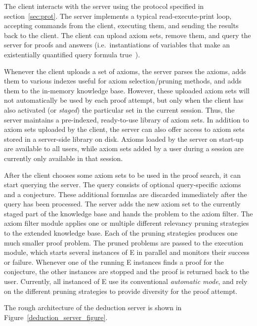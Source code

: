 \documentclass{article}
\begin{document}
The client interacts with the server using the protocol specified in
section~\ref{sec:prot}. The server implements a typical
read-execute-print loop, accepting commands from the client, executing
them, and sending the results back to the client. The client can
upload axiom sets, remove them, and query the server for proofs and
answers (i.e.\ instantiations of variables that make an existentially
quantified query formula true~\cite{SSSU:TPTP-ANS}).

Whenever the client uploads a set of axioms, the server parses the
axioms, adds them to various indexes useful for axiom
selection/pruning methods, and adds them to the in-memory knowledge
base. However, these uploaded axiom sets will not automatically be
used by each proof attempt, but only when the client has also
activated (or \emph{staged}) the particular set in the current
session. Thus, the server maintains a pre-indexed, ready-to-use
library of axiom sets. In addition to axiom sets uploaded by the
client, the server can also offer access to axiom sets stored in a
server-side library on disk. Axioms loaded by the server on start-up
are available to all users, while axiom sets added by a user during a
session are currently only available in that session.

After the client chooses some axiom sets to be used in the proof
search, it can start querying the server. The query consists of
optional query-specific axioms and a conjecture. These additional
formulas are discarded immediately after the query has been
processed. The server adds the new axiom set to the currently staged
part of the knowledge base and hands the problem to the axiom
filter. The axiom filter module applies one or multiple different
relevancy pruning strategies to the extended knowledge base. Each of
the pruning strategies produces one much smaller proof problem. The
pruned problems are passed to the execution module, which starts
several instances of E in parallel and monitors their success or
failure. Whenever one of the running E instances finds a proof for the
conjecture, the other instances are stopped and the proof is returned
back to the user. Currently, all instanced of E use its conventional
\emph{automatic mode}, and rely on the different pruning strategies to
provide diversity for the proof attempt.

The rough architecture of the deduction server is shown in
Figure~\ref{deduction_server_figure}.
\end{document}
